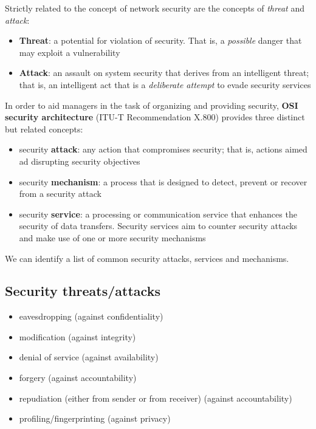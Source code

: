 Strictly related to the concept of network security are the concepts of
\textit{threat} and \textit{attack}:

\begin{itemize}
  \item \textbf{Threat}: a potential for violation of security. That is, a
    \textit{possible} danger that may exploit a vulnerability
  \item \textbf{Attack}: an assault on system security that derives from an
    intelligent threat; that is, an intelligent act that is a
    \textit{deliberate attempt} to evade security services
\end{itemize}

In order to aid managers in the task of organizing and providing security,
\textbf{OSI security architecture} (ITU-T Recommendation X.800) provides three
distinct but related concepts:

\begin{itemize}
  \item security \textbf{attack}: any action that compromises security; that
    is, actions aimed ad disrupting security objectives
  \item security \textbf{mechanism}: a process that is designed to detect,
    prevent or recover from a security attack
  \item security \textbf{service}: a processing or communication service that
    enhances the security of data transfers. Security services aim to counter
    security attacks and make use of one or more security mechanisms
\end{itemize}

We can identify a list of common security attacks, services and mechanisms.

\subsection*{Security threats/attacks}
\begin{itemize}
  \item eavesdropping (against confidentiality)
  \item modification (against integrity)
  \item denial of service (against availability)
  \item forgery (against accountability)
  \item repudiation (either from sender or from receiver) (against accountability)
  \item profiling/fingerprinting (against privacy)
\end{itemize}

